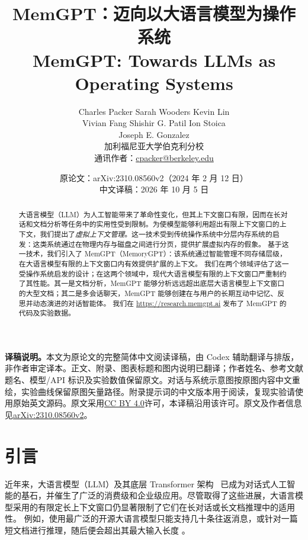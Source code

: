 \documentclass[UTF8,fontset=fandol,a4paper,11pt]{ctexart}
\title{\textbf{MemGPT：迈向以大语言模型为操作系统}\\[5pt]\large MemGPT: Towards LLMs as Operating Systems}
\author{Charles Packer \quad Sarah Wooders \quad Kevin Lin\\
Vivian Fang \quad Shishir G. Patil \quad Ion Stoica\\
Joseph E. Gonzalez\\[4pt]\small 加利福尼亚大学伯克利分校\\
\small 通讯作者：\href{mailto:cpacker@berkeley.edu}{cpacker@berkeley.edu}}
\date{原论文：arXiv:2310.08560v2（2024 年 2 月 12 日）\\\small 中文译稿：2026 年 10 月 5 日}
\newcommand{\website}{{\href{https://research.memgpt.ai}{https://research.memgpt.ai}}\xspace}
\newcommand{\ours}{MemGPT\xspace}
\newcommand{\ourslong}{MemoryGPT\xspace}
\begin{document}
\maketitle
\begin{mdframed}
\small\textbf{译稿说明。}本文为原论文的完整简体中文阅读译稿，由 Codex 辅助翻译与排版，非作者审定译本。正文、附录、图表标题和图内说明已翻译；作者姓名、参考文献题名、模型/API 标识及实验数值保留原文。对话与系统示意图按原图内容中文重绘，实验曲线保留原图矢量路径。附录提示词的中文版本用于阅读，复现实验请使用原始英文源码。原文采用\href{https://creativecommons.org/licenses/by/4.0/}{CC BY 4.0}许可，本译稿沿用该许可。原文及作者信息见\href{https://arxiv.org/abs/2310.08560v2}{arXiv:2310.08560v2}。
\end{mdframed}
\begin{abstract}

大语言模型（LLM）为人工智能带来了革命性变化，但其上下文窗口有限，因而在长对话和文档分析等任务中的实用性受到限制。为使模型能够利用超出有限上下文窗口的上下文，我们提出了\textit{虚拟上下文管理}。这一技术受到传统操作系统中分层内存系统的启发：这类系统通过在物理内存与磁盘之间进行分页，提供扩展虚拟内存的假象。
基于这一技术，我们引入了 \ours（\ourslong）：该系统通过智能管理不同存储层级，在大语言模型有限的上下文窗口内有效提供扩展的上下文。
我们在两个领域评估了这一受操作系统启发的设计；在这两个领域中，现代大语言模型有限的上下文窗口严重制约了其性能。其一是文档分析，\ours 能够分析远远超出底层大语言模型上下文窗口的大型文档；其二是多会话聊天，\ours 能够创建在与用户的长期互动中记忆、反思并动态演进的对话智能体。
我们在 \website 发布了 \ours 的代码及实验数据。


\end{abstract}

\section{引言}


近年来，大语言模型（LLM）及其底层 Transformer 架构~\citep{vaswani2017attention,devlin2018bert,brown2020language,ouyang2022instructgpt} 已成为对话式人工智能的基石，并催生了广泛的消费级和企业级应用。尽管取得了这些进展，大语言模型采用的有限定长上下文窗口仍显著限制了它们在长对话或长文档推理中的适用性。
例如，使用最广泛的开源大语言模型只能支持几十条往返消息，或针对一篇短文档进行推理，随后便会超出其最大输入长度 \citep{touvron2023llama2}。
\end{document}
